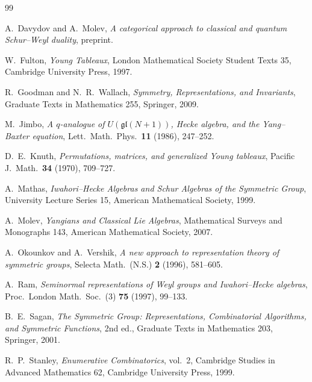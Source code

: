 \documentclass[12pt,a4paper]{article}
\theoremstyle{definition}
\theoremstyle{remark}
\newcommand{\gl}{\mathfrak{gl}}
\begin{document}
\begin{thebibliography}{99}

A.~Davydov and A.~Molev,
\emph{A categorical approach to classical and quantum Schur--Weyl duality},
preprint.

W.~Fulton,
\emph{Young Tableaux},
London Mathematical Society Student Texts 35,
Cambridge University Press, 1997.

R.~Goodman and N.~R.~Wallach,
\emph{Symmetry, Representations, and Invariants},
Graduate Texts in Mathematics 255, Springer, 2009.

M.~Jimbo,
\emph{A $q$-analogue of $U(\gl(N+1))$, Hecke algebra, and the
Yang--Baxter equation},
Lett.\ Math.\ Phys.\ \textbf{11} (1986), 247--252.

D.~E.~Knuth,
\emph{Permutations, matrices, and generalized Young tableaux},
Pacific J.\ Math.\ \textbf{34} (1970), 709--727.

A.~Mathas,
\emph{Iwahori--Hecke Algebras and Schur Algebras of the Symmetric
Group},
University Lecture Series 15,
American Mathematical Society, 1999.

A.~Molev,
\emph{Yangians and Classical Lie Algebras},
Mathematical Surveys and Monographs 143,
American Mathematical Society, 2007.

A.~Okounkov and A.~Vershik,
\emph{A new approach to representation theory of symmetric groups},
Selecta Math.\ (N.S.) \textbf{2} (1996), 581--605.

A.~Ram,
\emph{Seminormal representations of Weyl groups and Iwahori--Hecke
algebras},
Proc.\ London Math.\ Soc.\ (3) \textbf{75} (1997), 99--133.

B.~E.~Sagan,
\emph{The Symmetric Group: Representations, Combinatorial Algorithms,
and Symmetric Functions}, 2nd ed.,
Graduate Texts in Mathematics 203, Springer, 2001.

R.~P.~Stanley,
\emph{Enumerative Combinatorics}, vol.~2,
Cambridge Studies in Advanced Mathematics 62,
Cambridge University Press, 1999.

\end{thebibliography}
\end{document}
